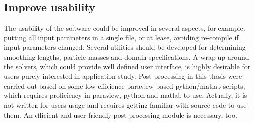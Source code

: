 \subsection{Improve usability}
The usability of the software could be improved in several aspects, for example, putting all input parameters in a single file, or at lease, avoiding re-compile if input parameters changed. Several utilities should be developed for determining smoothing lengths, particle masses and domain specifications.
A wrap up around the solvers, which could provide well defined user interface, is highly desirable for users purely interested in application study. Post processing in this thesis were carried out based on some low efficience paraview based python/matlab scripts, which requires proficiency in paraview, python and matlab to use. Actually, it is not written for users usage and requires getting familiar with source code to use them. An efficient and user-friendly post processing module is necessary, too.

